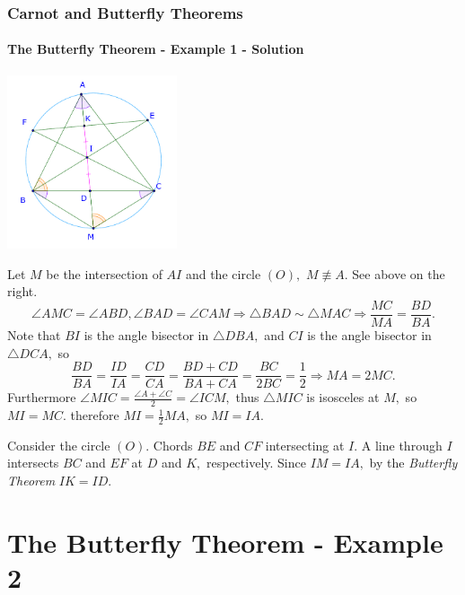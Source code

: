 \documentclass[8pt,xcolor=table,dvipsnames]{beamer}
\providecommand{\half}{\frac{1}{2}}
\begin{document}
\begin{frame}[t]
    \frametitle{Carnot and Butterfly Theorems}
    \framesubtitle{The Butterfly Theorem - Example 1 - Solution}
    \begin{center}
        \includegraphics[width=5cm]{./svg/pdf/24-25-s2-g3-p5-2.pdf}
    \end{center}
    \begin{overprint}
        Let $M$ be the intersection of $AI$ and the circle $(O),$ $M \not \equiv A.$ See above on the right.
        \[
            \angle AMC = \angle ABD, \angle BAD = \angle CAM \Rightarrow \triangle BAD \sim \triangle MAC \Rightarrow \frac{MC}{MA} = \frac{BD}{BA}.
        \]
        Note that $BI$ is the angle bisector in $\triangle DBA,$ and $CI$ is the angle bisector in $\triangle DCA,$ so 
        \[
            \frac{BD}{BA} = \frac{ID}{IA} = \frac{CD}{CA} = \frac{BD + CD}{BA + CA} = \frac{BC}{2BC} = \frac{1}{2}
            \Rightarrow MA = 2MC.
        \]
        Furthermore $\angle MIC = \frac{\angle A + \angle C}{2} = \angle ICM,$ thus $\triangle MIC$ is isosceles at $M,$
        so $MI = MC.$ therefore $MI = \half MA,$ so $MI = IA.$   
        
        Consider the circle $(O).$ Chords $BE$ and $CF$ intersecting at $I.$ A line through $I$ intersects $BC$ and $EF$ at $D$ and $K,$ respectively.
        Since $IM = IA,$ by the \textit{Butterfly Theorem} $\boxed{IK = ID.}$
    \end{overprint}        
\end{frame}

\section{The Butterfly Theorem - Example 2}
\end{document}
